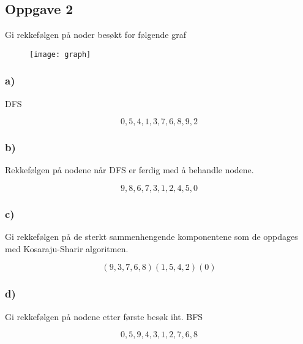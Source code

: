 \documentclass{article}
\begin{document}
    \subsection{Oppgave 2}

    Gi rekkefølgen på noder besøkt for følgende graf

    \begin{figure}[H]
        \begin{center}
            \texttt{[image: graph]}
        \end{center}
    \end{figure}

    \subsubsection{a)}
    \begin{ans}
        DFS

        \[ 0,5,4,1,3,7,6,8,9,2 \]
    \end{ans}

    \subsubsection{b)}
    \begin{ans} 
        Rekkefølgen på nodene når DFS er ferdig med å behandle nodene.

        \[ 9,8,6,7,3,1,2,4,5,0 \]
    \end{ans}

    \subsubsection{c)}

    \begin{ans}
        Gi rekkefølgen på de sterkt sammenhengende komponentene som de oppdages med Kosaraju-Sharir algoritmen.

        \[ (9,3,7,6,8) (1,5,4,2) (0) \]


    \end{ans}

    \subsubsection{d)}


    \begin{ans}
    Gi rekkefølgen på nodene etter første besøk iht. BFS

    \[ 0,5,9,4,3,1,2,7,6,8\]
        
    \end{ans}
\end{document}
